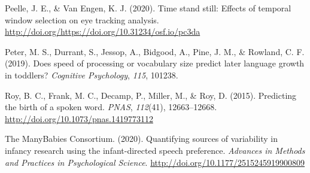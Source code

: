 \documentclass[10pt, letterpaper]{article}
\begin{document}
\leavevmode\hypertarget{ref-Peelle2020}{}%
Peelle, J. E., \& Van Engen, K. J. (2020). Time stand still: Effects of
temporal window selection on eye tracking analysis.
\url{http://doi.org/https://doi.org/10.31234/osf.io/pc3da}

\leavevmode\hypertarget{ref-peter2019}{}%
Peter, M. S., Durrant, S., Jessop, A., Bidgood, A., Pine, J. M., \&
Rowland, C. F. (2019). Does speed of processing or vocabulary size
predict later language growth in toddlers? \emph{Cognitive Psychology},
\emph{115}, 101238.

\leavevmode\hypertarget{ref-Roy2015}{}%
Roy, B. C., Frank, M. C., Decamp, P., Miller, M., \& Roy, D. (2015).
Predicting the birth of a spoken word. \emph{PNAS}, \emph{112}(41),
12663--12668. \url{http://doi.org/10.1073/pnas.1419773112}

\leavevmode\hypertarget{ref-TheManyBabiesConsortium2020}{}%
The ManyBabies Consortium. (2020). Quantifying sources of variability in
infancy research using the infant-directed speech preference.
\emph{Advances in Methods and Practices in Psychological Science}.
\url{http://doi.org/10.1177/2515245919900809}


\end{document}
